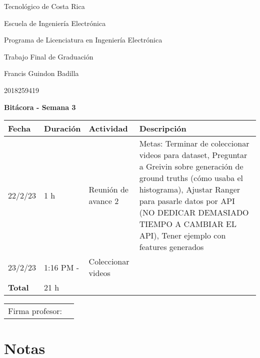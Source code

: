 \documentclass[12pt,oneside]{book}
\begin{document}
 \graphicspath{{./}{../tesis/fig/}}
  Tecnológico de Costa Rica
  \par\vspace{1mm}
  Escuela de Ingeniería Electrónica
  \par\vspace{1mm}
  Programa de Licenciatura en Ingeniería Electrónica
  \par\vspace{10mm}
  Trabajo Final de Graduación
  \par\vspace{1mm}
  Francis Guindon Badilla
  \par\vspace{1mm}
  2018259419
  \par\vspace{10mm}
  \large\textbf{Bitácora - Semana 3}
  \par\vspace{10mm}
  \small

  \begin{table} [!h]
    \centering
    \small
    \begin{tabular}{p{1.5 cm} p{2.1 cm} p{5 cm} p{8 cm}}
      \hline
      Fecha & Duración & Actividad & Descripción \\
      \hline
      22/2/23 & 1 h & Reunión de avance 2 & Metas: Terminar de coleccionar videos para dataset, Preguntar a Greivin sobre generación de ground truths (cómo usaba el histograma), Ajustar Ranger para pasarle datos por API (NO DEDICAR DEMASIADO TIEMPO A CAMBIAR EL API), Tener ejemplo con features generados \\
      23/2/23 & 1:16 PM - & Coleccionar videos & \\
      \hline
      \textbf{Total} & 21 h \\
      \hline
    \end{tabular}
  \end{table}
  
  \vfill

  \begin{tabular}{p{3 cm} p{10 cm}}
    Firma profesor: & \\
    \cline{2-2}
  \end{tabular}

  \newpage

  \section{Notas}
  \setlength\parindent{0pt}
\end{document}
